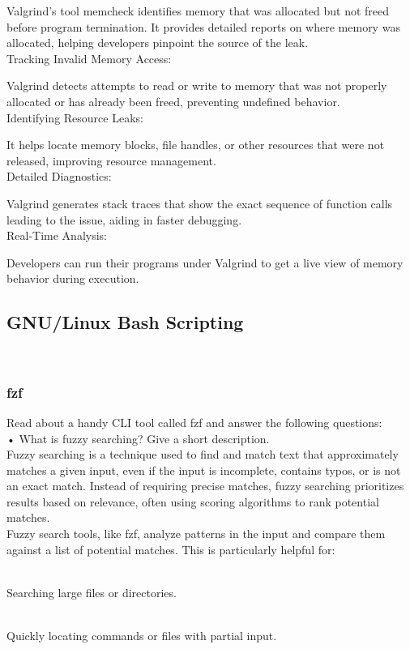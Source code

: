 \documentclass[a4paper,12pt]{article}
\begin{document}
Valgrind’s tool memcheck identifies memory that was allocated but not freed before program termination.
It provides detailed reports on where memory was allocated, helping developers pinpoint the source of the leak.
\\Tracking Invalid Memory Access:

Valgrind detects attempts to read or write to memory that was not properly allocated or has already been freed, preventing undefined behavior.
\\Identifying Resource Leaks:

It helps locate memory blocks, file handles, or other resources that were not released, improving resource management.
\\Detailed Diagnostics:

Valgrind generates stack traces that show the exact sequence of function calls leading to the issue, aiding in faster debugging.
\\Real-Time Analysis:

Developers can run their programs under Valgrind to get a live view of memory behavior during execution.
\\
\subsection{GNU/Linux Bash Scripting}
\\
\subsubsection{fzf}
Read about a handy CLI tool called fzf and answer the following questions:
\\• What is fuzzy searching? Give a short description.
\\Fuzzy searching is a technique used to find and match text that approximately matches a given input, even if the input is incomplete, contains typos, or is not an exact match. Instead of requiring precise matches, fuzzy searching prioritizes results based on relevance, often using scoring algorithms to rank potential matches.
\\Fuzzy search tools, like fzf, analyze patterns in the input and compare them against a list of potential matches. This is particularly helpful for:

\\Searching large files or directories.

\\Quickly locating commands or files with partial input.
\end{document}

